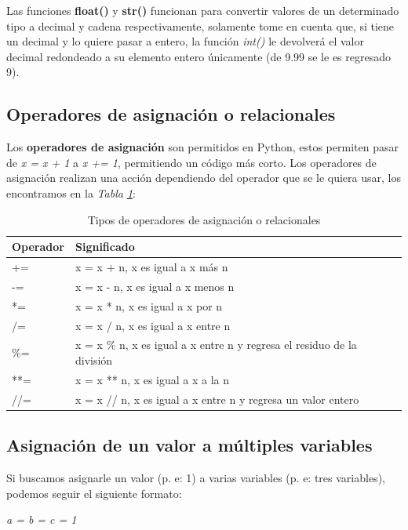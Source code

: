 Las funciones \textbf{float()} y \textbf{str()} funcionan para convertir valores de un determinado tipo a decimal y cadena respectivamente, solamente tome en cuenta que, si tiene un decimal y lo quiere pasar a entero, la función \textit{int()} le devolverá el valor decimal redondeado a su elemento entero únicamente (de 9.99 se le es regresado 9).


\subsection{Operadores de asignación o relacionales}
\hspace{0.55cm}Los \textbf{operadores de asignación} son permitidos en Python, estos permiten pasar de \textit{x = x + 1} a \textit{x += 1}, permitiendo un código más corto. Los operadores de asignación realizan una acción dependiendo del operador que se le quiera usar, los encontramos en la \textit{Tabla \ref{tab: 6}}:
\begin{table}[H]
    \begin{center}
        \caption{Tipos de operadores de asignación o relacionales}
        \label{tab: 6}
        \begin{tabular}{l|l}
            \hline
            \textbf{Operador} & \textbf{Significado} \\
            \hline
            +=		& x = x + n, x es igual a x más n \\
            -=		& x = x - n, x es igual a x menos n \\
            *=		& x = x * n, x es igual a x por n \\
            /=		& x = x / n, x es igual a x entre n \\
            \%=		& x = x \% n, x es igual a x entre n y regresa el residuo de la división \\
            **=		& x = x ** n, x es igual a x a la n \\
            //=		& x = x // n, x es igual a x entre n y regresa un valor entero \\
            \hline
        \end{tabular}
    \end{center}
\end{table}


\subsection{Asignación de un valor a múltiples variables}
\hspace{0.55cm}Si buscamos asignarle un valor (p. e: 1) a varias variables (p. e: tres variables), podemos seguir el siguiente formato:
\begin{center}
	\textit{a = b = c = 1}
\end{center}


